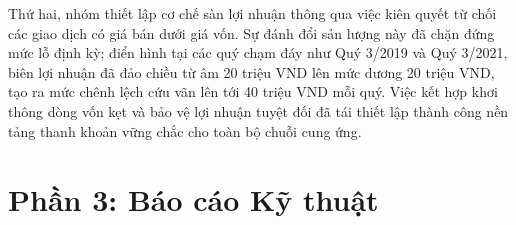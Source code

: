 \documentclass{article}
\begin{document}
Thứ hai, nhóm thiết lập cơ chế sàn lợi nhuận thông qua việc kiên quyết từ chối các giao dịch có giá bán dưới giá vốn. Sự đánh đổi sản lượng này đã chặn đứng mức lỗ định kỳ; điển hình tại các quý chạm đáy như Quý 3/2019 và Quý 3/2021, biên lợi nhuận đã đảo chiều từ âm 20 triệu VND lên mức dương 20 triệu VND, tạo ra mức chênh lệch cứu vãn lên tới 40 triệu VND mỗi quý. Việc kết hợp khơi thông dòng vốn kẹt và bảo vệ lợi nhuận tuyệt đối đã tái thiết lập thành công nền tảng thanh khoản vững chắc cho toàn bộ chuỗi cung ứng. 


\setcounter{section}{3}
\setcounter{subsection}{0}

\section*{Phần 3: Báo cáo Kỹ thuật}



\end{document}
